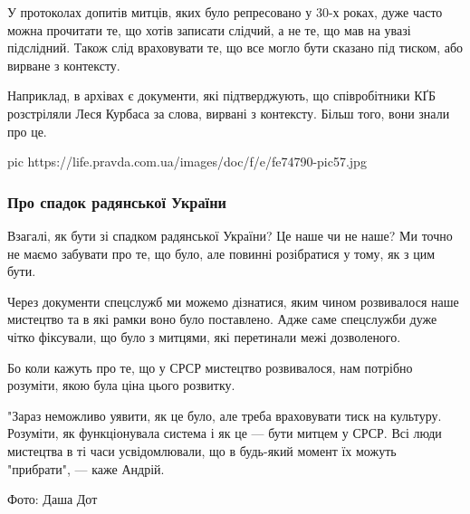 У протоколах допитів митців, яких було репресовано у 30-х роках, дуже часто
можна прочитати те, що хотів записати слідчий, а не те, що мав на увазі
підслідний. Також слід враховувати те, що все могло бути сказано під тиском,
або вирване з контексту.

Наприклад, в архівах є документи, які підтверджують, що співробітники КҐБ
розстріляли Леся Курбаса за слова, вирвані з контексту. Більш того, вони знали
про це.

\ifcmt
pic https://life.pravda.com.ua/images/doc/f/e/fe74790-pic57.jpg
\fi

\subsubsection{Про спадок радянської України}

Взагалі, як бути зі спадком радянської України? Це наше чи не наше? Ми точно не
маємо забувати про те, що було, але повинні розібратися у тому, як з цим бути.

Через документи спецслужб ми можемо дізнатися, яким чином розвивалося наше
мистецтво та в які рамки воно було поставлено. Адже саме спецслужби дуже чітко
фіксували, що було з митцями, які перетинали межі дозволеного.

Бо коли кажуть про те, що у СРСР мистецтво розвивалося, нам потрібно розуміти,
якою була ціна цього розвитку.

"Зараз неможливо уявити, як це було, але треба враховувати тиск на культуру.
Розуміти, як функціонувала система і як це — бути митцем у СРСР. Всі люди
мистецтва в ті часи усвідомлювали, що в будь-який момент їх можуть "прибрати",
— каже Андрій.

Фото: Даша Дот
